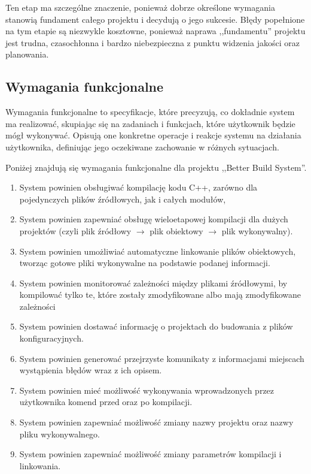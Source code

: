 Ten etap  ma szczególne znaczenie, ponieważ dobrze określone wymagania stanowią fundament całego projektu i decydują o jego sukcesie. Błędy popełnione na tym etapie są niezwykle kosztowne, ponieważ naprawa ,,fundamentu'' projektu jest trudna, czasochłonna i bardzo niebezpieczna z punktu widzenia jakości oraz planowania.

\subsection{Wymagania funkcjonalne}
Wymagania funkcjonalne to specyfikacje, które precyzują, co dokładnie system ma realizować, skupiając się na zadaniach i funkcjach, które użytkownik będzie mógł wykonywać. Opisują one konkretne operacje i reakcje systemu na działania użytkownika, definiując jego oczekiwane zachowanie w różnych sytuacjach.

Poniżej znajdują się wymagania funkcjonalne dla projektu ,,Better Build System''.
\begin{enumerate}
    \item System powinien obsługiwać kompilację kodu C++, zarówno dla pojedynczych plików źródłowych, jak i całych modułów, 
    \item System powinien zapewniać obsługę wieloetapowej kompilacji dla dużych projektów (czyli plik źródłowy $\rightarrow$ plik obiektowy $\rightarrow$ plik wykonywalny).
    \item System powinien umożliwiać automatyczne linkowanie plików obiektowych, tworząc gotowe pliki wykonywalne na podstawie podanej informacji.
    \item System powinien monitorować zależności między plikami źródłowymi, by kompilować tylko te, które zostały zmodyfikowane albo mają zmodyfikowane zależności
    \item System powinien dostawać informację o projektach do budowania z plików konfiguracyjnych.
    \item System powinien generować przejrzyste komunikaty z informacjami miejscach wystąpienia błędów wraz z ich opisem.
    \item System powinien mieć możliwość wykonywania wprowadzonych przez użytkownika komend przed oraz po kompilacji.
    \item System powinien zapewniać możliwość zmiany nazwy projektu oraz nazwy pliku wykonywalnego.
    \item System powinien zapewniać możliwość zmiany parametrów kompilacji i linkowania.
\end{enumerate}

